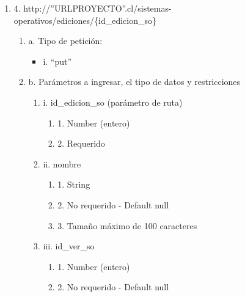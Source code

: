 \begin{enumerate}
    \item 4. http://”URLPROYECTO”.cl/sistemas-operativos/ediciones/\{id\_edicion\_so\}
    \begin{enumerate}
        \item a. Tipo de petición:
            \begin{itemize}
               \item i. “put”
            \end{itemize}
        \item b. Parámetros a ingresar, el tipo de datos y restricciones
            \begin{enumerate}
                \item i. id\_edicion\_so (parámetro de ruta)
                    \begin{enumerate}
                        \item 1. Number (entero)
                        \item 2. Requerido
                    \end{enumerate}
                \item ii. nombre
                    \begin{enumerate}
                        \item 1. String
                        \item 2. No requerido - Default null
                        \item 3. Tamaño máximo de 100 caracteres
                    \end{enumerate}
                \item iii. id\_ver\_so
                    \begin{enumerate}
                        \item 1. Number (entero)
                        \item 2. No requerido - Default null
                    \end{enumerate}
            \end{enumerate}
    \end{enumerate}


\end{enumerate}
